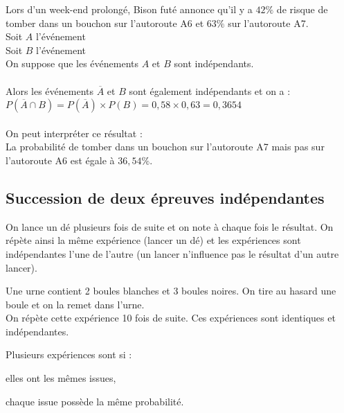 \begin{bexemple}
    Lors d'un week-end prolongé, Bison futé annonce qu'il y a $42\%$ de risque de tomber dans un bouchon sur l'autoroute A6 et $63\%$ sur l'autoroute A7.\\
    Soit $A$ l'événement \\
    Soit $B$ l'événement \\
    On suppose que les événements $A$ et $B$ sont indépendants.\\
    \\
    Alors les événements $\overline{A}$ et $B$ sont également indépendants et on a :\\
    $P(\overline{A} \cap B)=P(\overline{A})\times P(B)=0,58\times 0,63=0,3654$\\
    \\
    On peut interpréter ce résultat : \\
    La probabilité de tomber dans un bouchon sur l'autoroute A7 mais pas sur l'autoroute A6 est égale à $36,54\%$.
\end{bexemple}

\subsection{Succession de deux épreuves indépendantes}

\begin{bexemples}
    \begin{itemEx}
        \item On lance un dé plusieurs fois de suite et on note à chaque fois le résultat. On répète ainsi la même expérience (lancer un dé) et les expériences sont indépendantes l'une de l'autre (un lancer n'influence pas le résultat d'un autre lancer).
        \item Une urne contient 2 boules blanches et 3 boules noires. On tire au hasard une boule et on la remet dans l'urne.\\
        On répète cette expérience 10 fois de suite. Ces expériences sont identiques et indépendantes.
    \end{itemEx}
\end{bexemples}

\begin{bdefi}
	Plusieurs expériences sont  si :
    \begin{itemDef}
        \item elles ont les mêmes issues,
        \item chaque issue possède la même probabilité.
    \end{itemDef} 
\end{bdefi}

